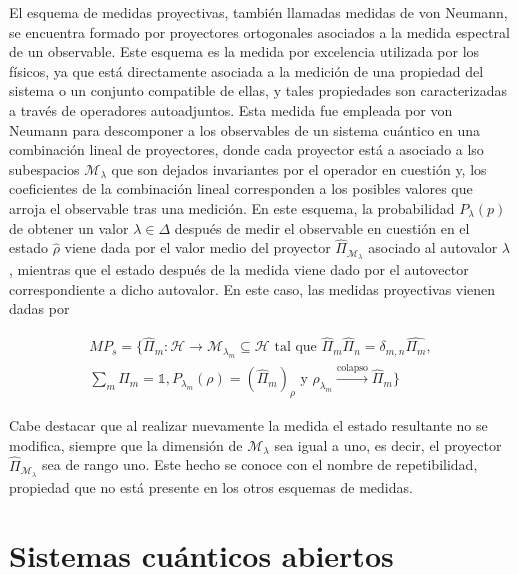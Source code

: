 \cite{sttiwuer}

El esquema de medidas proyectivas, también llamadas medidas de von Neumann, se encuentra formado por proyectores ortogonales asociados a la medida espectral de un observable. Este esquema es la medida por excelencia utilizada por los físicos, ya que está directamente asociada a la medición de una propiedad del sistema o un conjunto compatible de ellas, y tales propiedades son caracterizadas a través de operadores autoadjuntos. Esta medida fue empleada por von Neumann para descomponer a los observables de un sistema cuántico en una combinación lineal de proyectores, donde cada proyector está a asociado a lso subespacios $\mathcal{M}_\lambda$ que son dejados invariantes por el operador en cuestión y, los coeficientes de la combinación lineal corresponden a los posibles valores que arroja el observable tras una medición. En este esquema, la probabilidad $P_\lambda(p)$ de obtener un valor $\lambda \in \Delta$ después de medir el observable en cuestión en el estado $\hat{\rho}$ viene dada por el valor medio del proyector $\hat{\Pi}_{\mathcal{M}_\lambda}$ asociado al autovalor $\lambda$, mientras que el estado después de la medida viene dado por el autovector correspondiente a dicho autovalor. En este caso, las medidas proyectivas vienen dadas por

\begin{equation}
    \begin{array}{r}
    MP_s = \{\hat{\Pi}_m: \mathcal{H} \rightarrow \mathcal{M}_{\lambda_m} \subseteq \mathcal{H} \text{ tal que } \hat{\Pi}_m \hat{\Pi}_n = \delta_{m,n} \hat{\Pi_m}, \\
    \sum\limits_m \hat{\Pi}_m = \mathds{1}, P_{\lambda_m}(\rho) = (\hat{\Pi}_m)_\rho \text{ y } \rho_{\lambda_m} \xrightarrow{\text{colapso}} \hat{\Pi}_m\}
    \end{array}
\end{equation}

Cabe destacar que al realizar nuevamente la medida el estado resultante no se modifica, siempre que la dimensión de $\mathcal{M}_\lambda$ sea igual a uno, es decir, el proyector $\hat{\Pi}_{\mathcal{M}_\lambda}$ sea de rango uno. Este hecho se conoce con el nombre de repetibilidad, propiedad que no está presente en los otros esquemas de medidas.

\section{Sistemas cuánticos abiertos}

